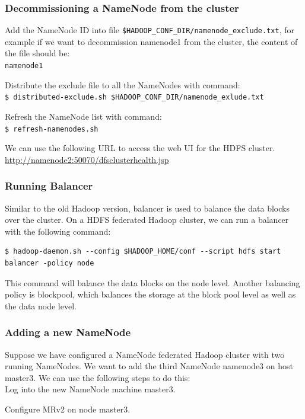 \subsubsection*{Decommissioning a NameNode from the cluster}
Add the NameNode ID into file \verb|$HADOOP_CONF_DIR/namenode_exclude.txt|, for example if we want to decommission namenode1 from the cluster, the content of the file should be: \\
\verb|namenode1|

Distribute the exclude file to all the NameNodes with command: \\
\verb|$ distributed-exclude.sh $HADOOP_CONF_DIR/namenode_exlude.txt|

Refresh the NameNode list with command: \\
\verb|$ refresh-namenodes.sh|

We can use the following URL to access the web UI for the HDFS cluster.
\url{http://namenode2:50070/dfsclusterhealth.jsp}

\subsubsection*{Running Balancer}
Similar to the old Hadoop version, balancer is used to balance the data blocks over the cluster. On a HDFS federated Hadoop cluster, we can run a balancer with the following command: \\
\lstset{style=bashstyle}
\begin{lstlisting}$ hadoop-daemon.sh --config $HADOOP_HOME/conf --script hdfs start balancer -policy node
\end{lstlisting}

This command will balance the data blocks on the node level. Another balancing policy is blockpool, which balances the storage at the block pool level as well as the data node level.

\subsubsection*{Adding a new NameNode}
Suppose we have configured a NameNode federated Hadoop cluster with two running NameNodes. We want to add the third NameNode namenode3 on host master3. We can use the following steps to do this: \\

Log into the new NameNode machine master3.

Configure MRv2 on node master3.

